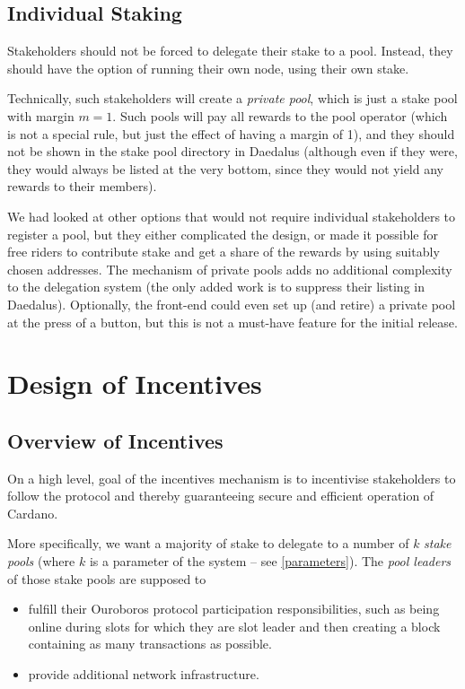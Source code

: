 \documentclass[11pt,a4paper]{article}
\begin{document}
\subsection{Individual Staking}
\label{individual-staking}

Stakeholders should not be forced to delegate their stake to a
pool. Instead, they should have the option of running their own node,
using their own stake.

Technically, such stakeholders will create a \emph{private pool},
which is just a stake pool with margin \(m=1\). Such pools will
pay all rewards to the pool operator (which is not a special rule, but
just the effect of having a margin of 1), and they should not be shown
in the stake pool directory in Daedalus (although even if they were,
they would always be listed at the very bottom, since they would not
yield any rewards to their members).

We had looked at other options that would not require individual
stakeholders to register a pool, but they either complicated the
design, or made it possible for free riders to contribute stake and
get a share of the rewards by using suitably chosen addresses. The
mechanism of private pools adds no additional complexity to the
delegation system (the only added work is to suppress their listing in
Daedalus). Optionally, the front-end could even set up (and retire) a
private pool at the press of a button, but this is not a must-have
feature for the initial release.

\section{Design of Incentives}
\label{design-of-incentives}

\subsection{Overview of Incentives}
\label{overview-of-incentives}

On a high level, goal of the incentives mechanism is to incentivise
stakeholders to follow the protocol and thereby guaranteeing secure and
efficient operation of Cardano.

More specifically, we want a majority of stake to
delegate to a number of \(k\) \emph{stake pools} (where \(k\) is a
parameter of the system -- see \cref{parameters}). The
\emph{pool leaders} of those stake pools are supposed to

\begin{itemize}
\item
  fulfill their Ouroboros protocol participation responsibilities,
  such as being online during slots for which they are slot leader and
  then creating a block containing as many transactions as possible.
\item
  provide additional network infrastructure.
\end{itemize}
\end{document}
